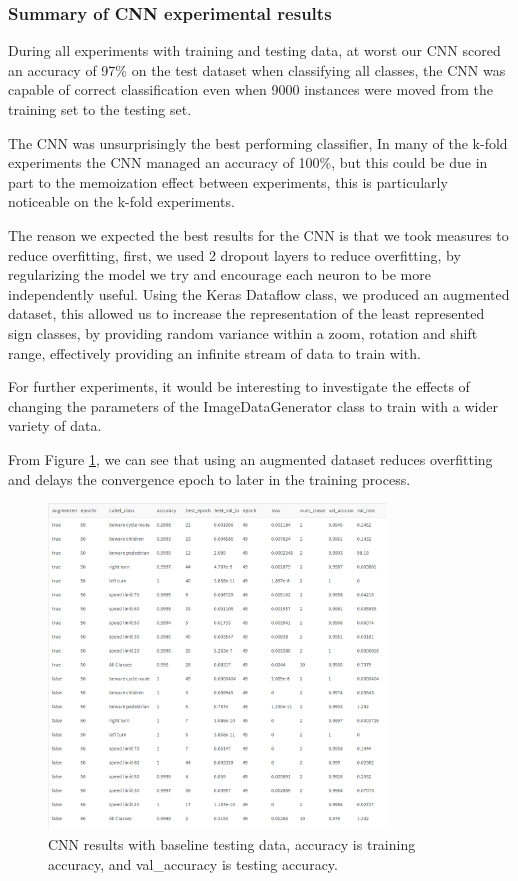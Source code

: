 \documentclass[11pt]{article}
\begin{document}
\subsubsection{Summary of CNN experimental results}

During all experiments with training and testing data, at worst our CNN scored an accuracy of 97\% on the test dataset when classifying all classes, the CNN was capable of correct classification even when 9000 instances were moved from the training set to the testing set.

The CNN was unsurprisingly the best performing classifier, In many of the k-fold experiments the CNN managed an accuracy of 100\%, but this could be due in part to the memoization effect between experiments, this is particularly noticeable on the k-fold experiments.

The reason we expected the best results for the CNN is that we took measures to reduce overfitting, first, we used 2 dropout layers to reduce overfitting, by regularizing the model we try and encourage each neuron to be more independently useful.
Using the Keras Dataflow class, we produced an augmented dataset, this allowed us to increase the representation of the least represented sign classes, by providing random variance within a zoom, rotation and shift range, effectively providing an infinite stream of data to train with.

For further experiments, it would be interesting to investigate the effects of changing the parameters of the ImageDataGenerator class to train with a wider variety of data.

From Figure \ref{CNNResults}, we can see that using an augmented dataset reduces overfitting and delays the convergence epoch to later in the training process.
\begin{figure}[H]
  \centering 
  \includegraphics[width = 0.8\textwidth, keepaspectratio]{Images/CNN_resultsWithBaseTestData.png} 
  \caption {CNN results with baseline testing data, accuracy is training accuracy, and val\_accuracy is testing accuracy.} \label{CNNResults}
\end{figure}
\end{document}
